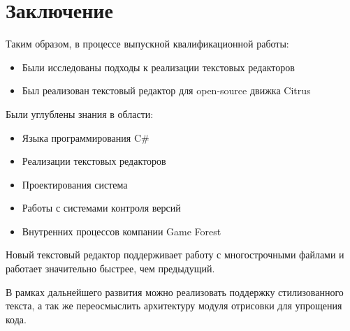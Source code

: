 \documentclass{fefu}
\begin{document}
	\section*{Заключение}
		\par Таким образом, в процессе выпускной квалификационной работы:
		\begin{itemize}
			\item Были исследованы подходы к реализации текстовых редакторов
			\item Был реализован текстовый редактор для open-source движка Citrus
		\end{itemize}
		\par Были углублены знания в области:
		\begin{itemize}
			\item Языка программирования C\#
			\item Реализации текстовых редакторов
			\item Проектирования система
			\item Работы с системами контроля версий
			\item Внутренних процессов компании Game Forest
		\end{itemize}
		\par Новый текстовый редактор поддерживает работу с многострочными файлами и работает
		значительно быстрее, чем предыдущий.
		\par В рамках дальнейшего развития можно реализовать поддержку стилизованного текста,
		а так же переосмыслить архитектуру модуля отрисовки для упрощения кода.
	\newpage
	
		
\end{document}
